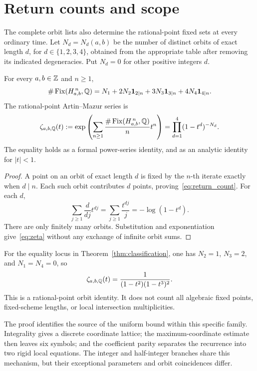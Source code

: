 \section{Return counts and scope}
\label{sec:returns}

The complete orbit lists also determine the rational-point fixed sets
at every ordinary time. Let \(N_d=N_d(a,b)\) be the number of distinct
orbits of exact length \(d\), for \(d\in\{1,2,3,4\}\), obtained from
the appropriate table after removing its indicated degeneracies.
Put \(N_d=0\) for other positive integers \(d\).

\begin{corollary}
\label{cor:returns}
For every \(a,b\in\mathbb{Z}\) and \(n\ge1\),
\begin{equation}
 \#\operatorname{Fix}(H_{a,b}^{\,n},\mathbb{Q})
 =N_1+2N_2\mathbf{1}_{2\mid n}+3N_3\mathbf{1}_{3\mid n}
                  +4N_4\mathbf{1}_{4\mid n}.
 \label{eq:return_count}
\end{equation}
The rational-point Artin--Mazur series is
\begin{equation}
 \zeta_{a,b,\mathbb{Q}}(t)
 :=\exp\left(\sum_{n\ge1}
       \frac{\#\operatorname{Fix}(H_{a,b}^{\,n},\mathbb{Q})}{n}t^n\right)
 =\prod_{d=1}^{4}(1-t^d)^{-N_d}.
 \label{eq:zeta}
\end{equation}
The equality holds as a formal power-series identity, and as an analytic
identity for \(|t|<1\).
\end{corollary}
\begin{proof}
A point on an orbit of exact length \(d\) is fixed by the \(n\)-th
iterate exactly when \(d\mid n\). Each such orbit contributes \(d\)
points, proving~\eqref{eq:return_count}. For each \(d\),
\[
 \sum_{j\ge1}\frac{d}{dj}t^{dj}
 =\sum_{j\ge1}\frac{t^{dj}}{j}=-\log(1-t^d).
\]
There are only finitely many orbits. Substitution and exponentiation
give~\eqref{eq:zeta} without any exchange of infinite orbit sums.
\end{proof}

For the equality locus in Theorem~\ref{thm:classification}, one has
\(N_2=1\), \(N_3=2\), and \(N_1=N_4=0\), so
\[
 \zeta_{a,b,\mathbb{Q}}(t)=\frac{1}{(1-t^2)(1-t^3)^2}.
\]
This is a rational-point orbit identity. It does not count all
algebraic fixed points, fixed-scheme lengths, or local intersection
multiplicities.

The proof identifies the source of the uniform bound within this
specific family. Integrality gives a discrete coordinate lattice;
the maximum-coordinate estimate then leaves six symbols; and the
coefficient parity separates the recurrence into two rigid local
equations. The integer and half-integer branches share this mechanism,
but their exceptional parameters and orbit coincidences differ.

